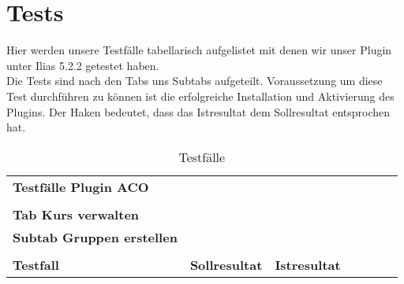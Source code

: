 \chapter{Tests}
\minitoc

Hier werden unsere Testfälle tabellarisch aufgelistet mit denen wir unser Plugin unter Ilias 5.2.2 getestet haben. \\
Die Tests sind nach den Tabs uns Subtabs aufgeteilt. Voraussetzung um diese Test durchführen zu können ist die erfolgreiche Installation und Aktivierung des Plugins.  
Der Haken bedeutet, dass das Istresultat dem Sollresultat entsprochen hat. \\

\begin{table}[]
	\centering
	\caption{Testfälle}
	\label{table1}
	\begin{tabular}{p{6cm}p{7cm}p{3cm}llll}
	\textbf{\large{Testfälle Plugin ACO } }                                                                                                              &                                                                                                          &             &  &  &  \\
		&                                                                                                                                                                  &             &  &  &  \\
		\textbf{Tab Kurs verwalten}                                                                                                                   &                                                                                                                                                                  &             &  &  &  \\
		\textbf{Subtab Gruppen erstellen }                                                                                                            &                                                                                                                                                                  &             &  &  &  \\
		&                                                                                                                                                                  &             &  &  &  \\
		\textbf{Testfall  }                                                                                                                           & \textbf{Sollresultat  }                                                                                                                                                   &\textbf{ Istresultat} &  &  &  \\

\end{tabular}
\end{table}
